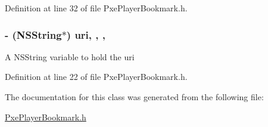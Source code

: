 Definition at line 32 of file Pxe\-Player\-Bookmark.\-h.

\hypertarget{interface_pxe_player_bookmark_ab8b1e16b624fa00bbd92e6611222405c}{
\subsubsection[{uri}]{\setlength{\rightskip}{0pt plus 5cm}-\/ (N\-S\-String$\ast$) uri\hspace{0.3cm}{\ttfamily [read]}, {\ttfamily [write]}, {\ttfamily [nonatomic]}, {\ttfamily [strong]}}}\label{interface_pxe_player_bookmark_ab8b1e16b624fa00bbd92e6611222405c}
A N\-S\-String variable to hold the uri 

Definition at line 22 of file Pxe\-Player\-Bookmark.\-h.



The documentation for this class was generated from the following file\-:\begin{DoxyCompactItemize}
\item 
\hyperlink{_pxe_player_bookmark_8h}{Pxe\-Player\-Bookmark.\-h}\end{DoxyCompactItemize}
